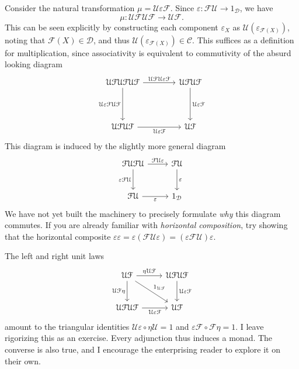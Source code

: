 Consider the natural transformation $\mu =\mathcal{U} \varepsilon \mathcal{F} $. Since $\varepsilon : \mathcal{F} \mathcal{U}  \to 1_{\mathcal{D} } $, we have
\[
	\mu : \mathcal{U} \mathcal{F} \mathcal{U} \mathcal{F}  \to \mathcal{U} \mathcal{F} 
.\]
This can be seen explicitly by constructing each component $\varepsilon_X$ as $\mathcal{U} (\varepsilon_{\mathcal{F} (X)} )$, noting that $\mathcal{F} (X)\in \mathcal{D} $, and thus $\mathcal{U} (\varepsilon_{\mathcal{F} (X)} )\in \mathcal{C} $. This suffices as a definition for multiplication, since associativity is equivalent to commutivity of the absurd looking diagram
\[\begin{tikzcd}[row sep = 4em, column sep = 4em]
\mathcal{U} \mathcal{F} \mathcal{U} \mathcal{F} \mathcal{U} \mathcal{F} \ar[" \mathcal{U} \mathcal{F} \mathcal{U} \varepsilon \mathcal{F}  ", r] \ar[" \mathcal{U} \varepsilon \mathcal{F} \mathcal{U} \mathcal{F}  "', d]  & \mathcal{U} \mathcal{F} \mathcal{U} \mathcal{F} \ar[" \mathcal{U} \varepsilon \mathcal{F}  ", d]  \\
\mathcal{U} \mathcal{F} \mathcal{U} \mathcal{F} \ar[" \mathcal{U} \varepsilon \mathcal{F}  "', r]  & \mathcal{U} \mathcal{F} 
\end{tikzcd}\]
This diagram is induced by the slightly more general diagram
\[\begin{tikzcd}[row sep = 2.5em, column sep = 2.5em]
\mathcal{F} \mathcal{U} \mathcal{F} \mathcal{U} \ar[" \mathcal{F} \mathcal{U} \varepsilon  ", r] \ar[" \varepsilon \mathcal{F} \mathcal{U}  "', d]  & \mathcal{F} \mathcal{U} \ar[" \varepsilon  ", d]  \\
\mathcal{F} \mathcal{U} \ar[" \varepsilon  "', r]  & 1_{\mathcal{D}} 
\end{tikzcd}\]
We have not yet built the machinery to precisely formulate \emph{why} this diagram commutes. If you are already familiar with \emph{horizontal composition}, try showing that the horizontal composite $\varepsilon \varepsilon =\varepsilon (\mathcal{F} \mathcal{U} \varepsilon )=(\varepsilon \mathcal{F} \mathcal{U} )\varepsilon $.

The left and right unit laws
\[\begin{tikzcd}[row sep = 2.5em, column sep = 2.5em]
\mathcal{U} \mathcal{F} \ar[" \eta \mathcal{U} \mathcal{F}  ", r] \ar[" \mathcal{U} \mathcal{F} \eta  "', d] \ar[" 1_{\mathcal{U} \mathcal{F} } ", dr]  & \mathcal{U} \mathcal{F} \mathcal{U} \mathcal{F} \ar[" \mathcal{U} \varepsilon \mathcal{F}  ", d]  \\
\mathcal{U} \mathcal{F} \mathcal{U} \mathcal{F} \ar[" \mathcal{U} \varepsilon \mathcal{F}  "', r]  & \mathcal{U} \mathcal{F} 
\end{tikzcd}\]
amount to the triangular identities $\mathcal{U} \varepsilon \circ \eta \mathcal{U} =1$ and $\varepsilon \mathcal{F} \circ \mathcal{F} \eta =1$. I leave rigorizing this as an exercise. Every adjunction thus induces a monad. The converse is also true, and I encourage the enterprising reader to explore it on their own.

